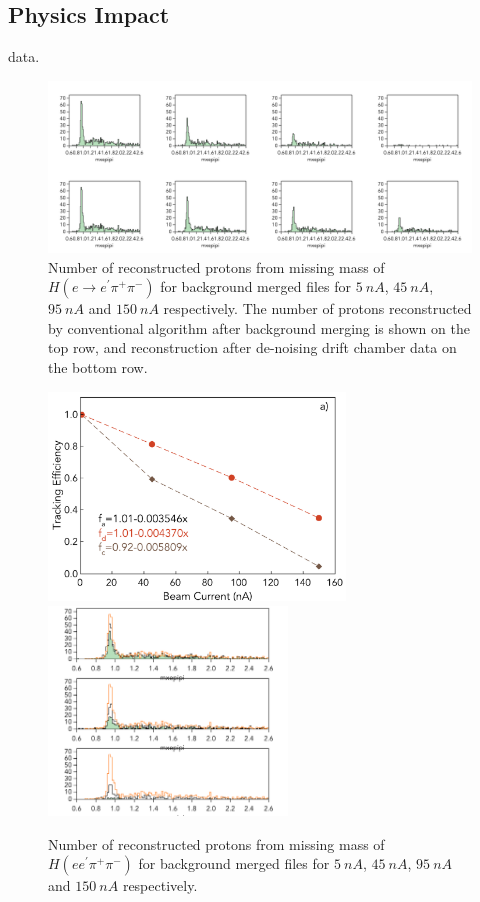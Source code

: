 \subsection{Physics Impact}

data.

\begin{figure}[!ht]
\begin{center}
 \includegraphics[width=6.1in]{images/figure_phys_conv.pdf}
\caption {Number of reconstructed protons from missing mass of $H(e \rightarrow e^\prime \pi^+\pi^-)$ for background 
merged files for  $5~nA$, $45~nA$, $95~nA$ and $150~nA$ respectively. The number of protons reconstructed by 
conventional algorithm after background merging is shown on the top row, and reconstruction after  de-noising drift 
chamber data on the bottom row.}
 \label{physics::conv_dn}
 \end{center}
\end{figure}


\begin{figure}[!ht]
\begin{center}
 \includegraphics[width=3.1in]{images/figure_phys_scan.pdf}
 \includegraphics[width=2.5in]{images/figure_phys_conv_compare.pdf}
\caption {Number of reconstructed protons from missing mass 
of $H(e e^\prime \pi^+\pi^-)$ for background merged files for 
$5~nA$, $45~nA$, $95~nA$ and $150~nA$ respectively.}
 \label{physics::conv_dn}
 \end{center}
\end{figure}

